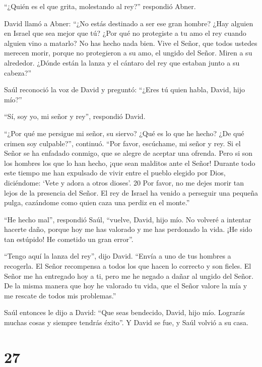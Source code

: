 ``¿Quién es el que grita, molestando al rey?'' respondió Abner.

 David llamó a Abner: ``¿No estás destinado a ser ese gran
hombre? ¿Hay alguien en Israel que sea mejor que tú? ¿Por qué no
protegiste a tu amo el rey cuando alguien vino a matarlo? 
No has hecho nada bien. Vive el Señor, que todos ustedes merecen morir,
porque no protegieron a su amo, el ungido del Señor. Miren a su
alrededor. ¿Dónde están la lanza y el cántaro del rey que estaban junto
a su cabeza?''

 Saúl reconoció la voz de David y preguntó: ``¿Eres tú
quien habla, David, hijo mío?''

``Sí, soy yo, mi señor y rey'', respondió David.

 ``¿Por qué me persigue mi señor, su siervo? ¿Qué es lo que
he hecho? ¿De qué crimen soy culpable?'', continuó.  ``Por
favor, escúchame, mi señor y rey. Si el Señor se ha enfadado conmigo,
que se alegre de aceptar una ofrenda. Pero si son los hombres los que lo
han hecho, ¡que sean malditos ante el Señor! Durante todo este tiempo me
han expulsado de vivir entre el pueblo elegido por Dios, diciéndome:
`Vete y adora a otros dioses'. 20 Por favor, no me dejes morir tan lejos
de la presencia del Señor. El rey de Israel ha venido a perseguir una
pequeña pulga, cazándome como quien caza una perdiz en el monte.''

 ``He hecho mal'', respondió Saúl, ``vuelve, David, hijo
mío. No volveré a intentar hacerte daño, porque hoy me has valorado y me
has perdonado la vida. ¡He sido tan estúpido! He cometido un gran
error''.

 ``Tengo aquí la lanza del rey'', dijo David. ``Envía a uno
de tus hombres a recogerla.  El Señor recompensa a todos
los que hacen lo correcto y son fieles. El Señor me ha entregado hoy a
ti, pero me he negado a dañar al ungido del Señor.  De la
misma manera que hoy he valorado tu vida, que el Señor valore la mía y
me rescate de todos mis problemas.''

 Saúl entonces le dijo a David: ``Que seas bendecido,
David, hijo mío. Lograrás muchas cosas y siempre tendrás éxito''. Y
David se fue, y Saúl volvió a su casa.

\hypertarget{section-26}{%
\section{27}\label{section-26}}

